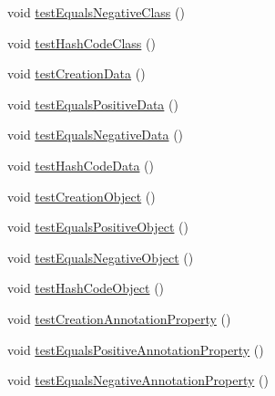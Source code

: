 \begin{DoxyCompactItemize}
void \hyperlink{classorg_1_1semanticweb_1_1owlapi_1_1datafactory_1_1_o_w_l_data_factory_test_case_ad583a7ee48212fa71b1e3a5bc62ffe8a}{test\-Equals\-Negative\-Class} ()
\item 
void \hyperlink{classorg_1_1semanticweb_1_1owlapi_1_1datafactory_1_1_o_w_l_data_factory_test_case_a8ac675e3c01552502d2bb9c3d89c4d71}{test\-Hash\-Code\-Class} ()
\item 
void \hyperlink{classorg_1_1semanticweb_1_1owlapi_1_1datafactory_1_1_o_w_l_data_factory_test_case_ad036a0f55c227a9744a57202cc110dbb}{test\-Creation\-Data} ()
\item 
void \hyperlink{classorg_1_1semanticweb_1_1owlapi_1_1datafactory_1_1_o_w_l_data_factory_test_case_a5440815b52779330f97b35d84be6d51d}{test\-Equals\-Positive\-Data} ()
\item 
void \hyperlink{classorg_1_1semanticweb_1_1owlapi_1_1datafactory_1_1_o_w_l_data_factory_test_case_aedff75ea38fca23757d04ca6ea11dd32}{test\-Equals\-Negative\-Data} ()
\item 
void \hyperlink{classorg_1_1semanticweb_1_1owlapi_1_1datafactory_1_1_o_w_l_data_factory_test_case_ab222e35f5c55e9decc78d790c2f8ff85}{test\-Hash\-Code\-Data} ()
\item 
void \hyperlink{classorg_1_1semanticweb_1_1owlapi_1_1datafactory_1_1_o_w_l_data_factory_test_case_a5fa6dfd8b6e0f4f486d074af1c048ea8}{test\-Creation\-Object} ()
\item 
void \hyperlink{classorg_1_1semanticweb_1_1owlapi_1_1datafactory_1_1_o_w_l_data_factory_test_case_ae410daf8a1669bf743769ac523ce1218}{test\-Equals\-Positive\-Object} ()
\item 
void \hyperlink{classorg_1_1semanticweb_1_1owlapi_1_1datafactory_1_1_o_w_l_data_factory_test_case_af6874a2efaae8ba4702636d556060cd5}{test\-Equals\-Negative\-Object} ()
\item 
void \hyperlink{classorg_1_1semanticweb_1_1owlapi_1_1datafactory_1_1_o_w_l_data_factory_test_case_aa3fd4c34e49ac13805725b37dec1b433}{test\-Hash\-Code\-Object} ()
\item 
void \hyperlink{classorg_1_1semanticweb_1_1owlapi_1_1datafactory_1_1_o_w_l_data_factory_test_case_a1d3a36cd761d52739f3f4cbb47d6a703}{test\-Creation\-Annotation\-Property} ()
\item 
void \hyperlink{classorg_1_1semanticweb_1_1owlapi_1_1datafactory_1_1_o_w_l_data_factory_test_case_a2f4c0b18e53430c30e153a4bddf4782d}{test\-Equals\-Positive\-Annotation\-Property} ()
\item 
void \hyperlink{classorg_1_1semanticweb_1_1owlapi_1_1datafactory_1_1_o_w_l_data_factory_test_case_ae3cb14174d5d7598f91fdc620b7eb53a}{test\-Equals\-Negative\-Annotation\-Property} ()

\end{DoxyCompactItemize}
